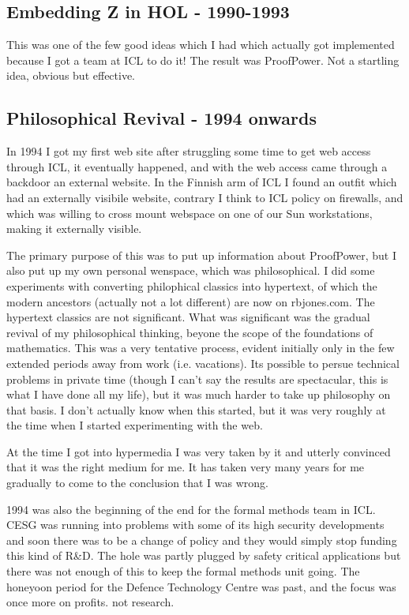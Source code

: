 \documentclass{rbjk}
\begin{document}
\begin{article}
\subsection{Embedding Z in HOL - 1990-1993}

This was one of the few good ideas which I had which actually got implemented because I got a team at ICL to do it!
The result was ProofPower.
Not a startling idea, obvious but effective.

\subsection{Philosophical Revival - 1994 onwards}

In 1994 I got my first web site after struggling some time to get web access through ICL, it eventually happened, and with the web access came through a backdoor an external website.
In the Finnish arm of ICL I found an outfit which had an externally visibile website, contrary I think to ICL policy on firewalls, and which was willing to cross mount webspace on one of our Sun workstations, making it externally visible.

The primary purpose of this was to put up information about ProofPower, but I also put up my own personal wenspace, which was philosophical.
I did some experiments with converting philophical classics into hypertext, of which the modern ancestors (actually not a lot different) are now on rbjones.com.
The hypertext classics are not significant.
What was significant was the gradual revival of my philosophical thinking, beyone the scope of the foundations of mathematics.
This was a very tentative process, evident initially only in the few extended periods away from work (i.e. vacations).
Its possible to persue technical problems in private time (though I can't say the results are spectacular, this is what I have done all my life), but it was much harder to take up philosophy on that basis.
I don't actually know when this started, but it was very roughly at the time when I started experimenting with the web.

At the time I got into hypermedia I was very taken by it and utterly convinced that it was the right medium for me.
It has taken very many years for me gradually to come to the conclusion that I was wrong.

1994 was also the beginning of the end for the formal methods team in ICL.
CESG was running into problems with some of its high security developments and soon there was to be a change of policy and they would simply stop funding this kind of R\&D.
The hole was partly plugged by safety critical applications but there was not enough of this to keep the formal methods unit going.
The honeyoon period for the Defence Technology Centre was past, and the focus was once more on profits. not research.


\end{article}
\end{document}
